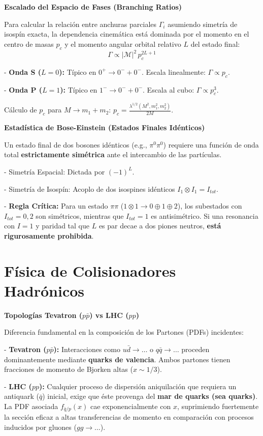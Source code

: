 \textbf{Escalado del Espacio de Fases (Branching Ratios)}

Para calcular la relación entre anchuras parciales $\Gamma_i$ asumiendo simetría de isospín exacta, la dependencia cinemática está dominada por el momento en el centro de masas $p_c$ y el momento angular orbital relativo $L$ del estado final:
$$\Gamma \propto |\mathcal{M}|^2 \, p_c^{2L+1}$$

- \textbf{Onda S ($L=0$):} Típico en $0^+ \to 0^- + 0^-$. Escala linealmente: $\Gamma \propto p_c$.
  
    - \textbf{Onda P ($L=1$):} Típico en $1^- \to 0^- + 0^-$. Escala al cubo: $\Gamma \propto p_c^3$.


Cálculo de $p_c$ para $M \to m_1 + m_2$: $p_c = \frac{\lambda^{1/2}(M^2, m_1^2, m_2^2)}{2M}$.



\textbf{Estadística de Bose-Einstein (Estados Finales Idénticos)}

Un estado final de dos bosones idénticos (e.g., $\pi^0\pi^0$) requiere una función de onda total \textbf{estrictamente simétrica} ante el intercambio de las partículas.

  
  - Simetría Espacial: Dictada por $(-1)^L$.
 
  
  - Simetría de Isospín: Acoplo de dos isospines idénticos $I_1 \otimes I_1 = I_{tot}$. 


- \textbf{Regla Crítica:} Para un estado $\pi\pi$ ($1 \otimes 1 \to 0 \oplus 1 \oplus 2$), los subestados con $I_{tot} = 0, 2$ son simétricos, mientras que $I_{tot} = 1$ es antisimétrico. Si una resonancia con $I=1$ y paridad tal que $L$ es par decae a dos piones neutros, \textbf{está rigurosamente prohibida}.


\section*{Física de Colisionadores Hadrónicos}

\textbf{Topologías Tevatron ($p\bar{p}$) vs LHC ($pp$)}

Diferencia fundamental en la composición de los Partones (PDFs) incidentes:

    
    - \textbf{Tevatron ($p\bar{p}$):} Interacciones como $u\bar{d} \to \dots$ o $q\bar{q} \to \dots$ proceden dominantemente mediante \textbf{quarks de valencia}. Ambos partones tienen fracciones de momento de Bjorken altas ($x \sim 1/3$).
    
    
    - \textbf{LHC ($pp$):} Cualquier proceso de dispersión aniquilación que requiera un antiquark ($\bar{q}$) inicial, exige que éste provenga del \textbf{mar de quarks (sea quarks)}. La PDF asociada $f_{\bar{q}/p}(x)$ cae exponencialmente con $x$, suprimiendo fuertemente la sección eficaz a altas transferencias de momento en comparación con procesos inducidos por gluones ($gg \to \dots$).


